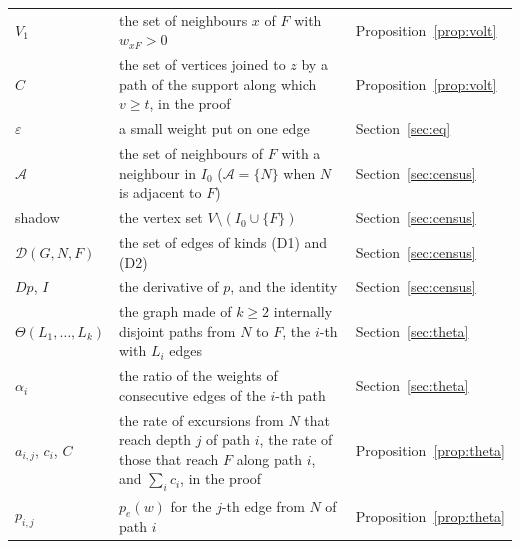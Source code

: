 \documentclass[11pt]{amsart}
\theoremstyle{remark}
\begin{document}
\begin{longtable}{@{}>{\raggedright\arraybackslash}p{}>{\raggedright\arraybackslash}p{}>{\raggedright\arraybackslash}p{}@{}}
$V_1$ & the set of neighbours $x$ of $F$ with $w_{xF}>0$ & Proposition~\ref{prop:volt} \\
$C$ & the set of vertices joined to $z$ by a path of the support along which $v\ge t$, in the proof & Proposition~\ref{prop:volt} \\
$\varepsilon$ & a small weight put on one edge & Section~\ref{sec:eq} \\
$\mathcal A$ & the set of neighbours of $F$ with a neighbour in $I_0$ ($\mathcal A=\{N\}$ when $N$ is adjacent to $F$) & Section~\ref{sec:census} \\
shadow & the vertex set $V\setminus(I_0\cup\{F\})$ & Section~\ref{sec:census} \\
$\mathcal D(G,N,F)$ & the set of edges of kinds (D1) and (D2) & Section~\ref{sec:census} \\
$Dp$, $I$ & the derivative of $p$, and the identity & Section~\ref{sec:census} \\
$\Theta(L_1,\dots,L_k)$ & the graph made of $k\ge2$ internally disjoint paths from $N$ to $F$, the $i$-th with $L_i$ edges & Section~\ref{sec:theta} \\
$\alpha_i$ & the ratio of the weights of consecutive edges of the $i$-th path & Section~\ref{sec:theta} \\
$a_{i,j}$, $c_i$, $C$ & the rate of excursions from $N$ that reach depth $j$ of path $i$, the rate of those that reach $F$ along path $i$, and $\sum_ic_i$, in the proof & Proposition~\ref{prop:theta} \\
$p_{i,j}$ & $p_e(w)$ for the $j$-th edge from $N$ of path $i$ & Proposition~\ref{prop:theta} \\
\bottomrule
\end{longtable}
\end{document}

